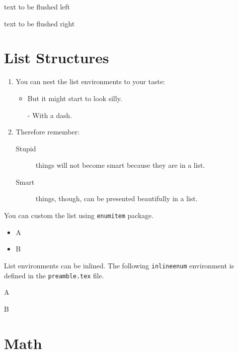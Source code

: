 \documentclass[conference]{IEEEtran}
\begin{document}
\begin{flushleft}
  text to be flushed left
\end{flushleft}

\begin{flushright}
  text to be flushed right
\end{flushright}

\section{List Structures}

\begin{enumerate}
  \item You can nest the list
        environments to your taste:
        \begin{itemize}
          \item But it might start to
                look silly.
          \item[-] With a dash.
        \end{itemize}
  \item Therefore remember:
        \begin{description}
          \item[Stupid] things will not
                become smart because they are
                in a list.
          \item[Smart] things, though,
                can be presented beautifully
                in a list.
        \end{description}
\end{enumerate}

You can custom the list using \texttt{enumitem} package.

\begin{itemize}[label=-]
  \item A
  \item B
\end{itemize}

List environments can be inlined. The following \texttt{inlineenum} environment is defined in the \texttt{preamble.tex} file.
\begin{inlineenum}
  \item A
  \item B
\end{inlineenum}

\section{Math}
\end{document}
